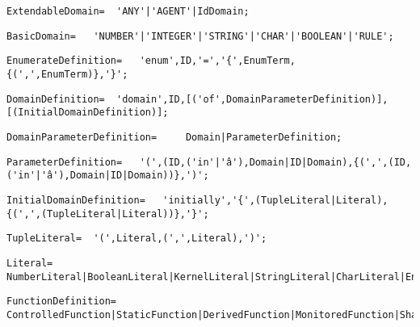 \documentclass{article}
\begin{document}
    \begin{lstlisting}[mathescape=true]
     ExtendableDomain= 	'ANY'|'AGENT'|IdDomain;
    \end{lstlisting}
    
    \begin{lstlisting}[mathescape=true]
     BasicDomain= 	'NUMBER'|'INTEGER'|'STRING'|'CHAR'|'BOOLEAN'|'RULE';
    \end{lstlisting}
    
    \begin{lstlisting}[mathescape=true]
     EnumerateDefinition= 	'enum',ID,'=','{',EnumTerm,{(',',EnumTerm)},'}';
    \end{lstlisting}
    
    \begin{lstlisting}[mathescape=true]
     DomainDefinition= 	'domain',ID,[('of',DomainParameterDefinition)],[(InitialDomainDefinition)];
    \end{lstlisting}
    
    \begin{lstlisting}[mathescape=true]
     DomainParameterDefinition= 	Domain|ParameterDefinition;
    \end{lstlisting}
    
    \begin{lstlisting}[mathescape=true]
     ParameterDefinition= 	'(',(ID,('in'|'â'),Domain|ID|Domain),{(',',(ID,('in'|'â'),Domain|ID|Domain))},')';
    \end{lstlisting}
    
    \begin{lstlisting}[mathescape=true]
     InitialDomainDefinition= 	'initially','{',(TupleLiteral|Literal),{(',',(TupleLiteral|Literal))},'}';
    \end{lstlisting}
    
    \begin{lstlisting}[mathescape=true]
     TupleLiteral= 	'(',Literal,(',',Literal),')';
    \end{lstlisting}
    
    \begin{lstlisting}[mathescape=true]
     Literal= 	NumberLiteral|BooleanLiteral|KernelLiteral|StringLiteral|CharLiteral|EnumTerm;
    \end{lstlisting}
    
    \begin{lstlisting}[mathescape=true]
     FunctionDefinition= 	ControlledFunction|StaticFunction|DerivedFunction|MonitoredFunction|SharedFunction|OutFunction;
    \end{lstlisting}
    
\end{document}
